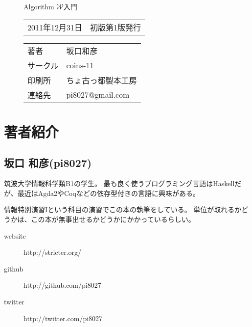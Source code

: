 
\begin{figure}[b]

{\LARGE Algorithm $\mathcal W$入門}

\hrulefill

\begin{tabular}{rl}
2011年12月31日 & 初版第1版発行
\end{tabular}

\vspace{1zh}

\begin{tabular}{ll}
著者     & 坂口和彦 \\
サークル & coins-11 \\
印刷所   & ちょ古っ都製本工房 \\%
連絡先   & pi8027@gmail.com \\
\end{tabular}

\hrulefill

\vspace{2zh}

\end{figure}

\section*{著者紹介}

\subsection*{坂口 和彦(pi8027)}

筑波大学情報科学類B1の学生。
最も良く使うプログラミング言語はHaskellだが、最近はAgda2やCoqなどの依存型付きの言語に興味がある。

情報特別演習Iという科目の演習でこの本の執筆をしている。
単位が取れるかどうかは、この本が無事出せるかどうかにかかっているらしい。

\begin{description}
\item[website] http://stricter.org/
\item[github] http://github.com/pi8027
\item[twitter] http://twitter.com/pi8027
\end{description}

